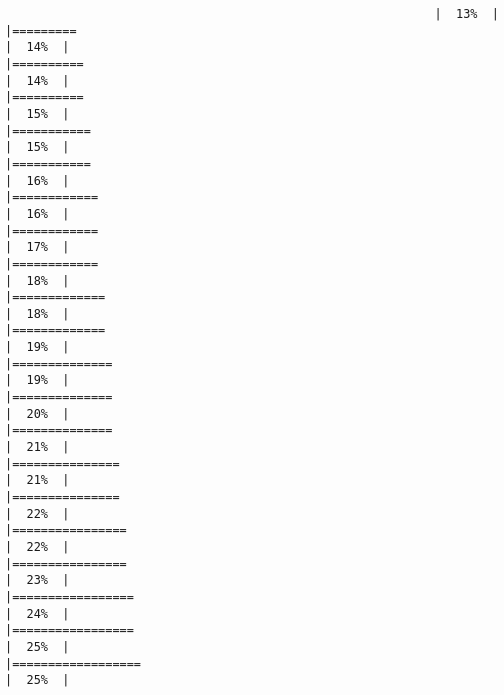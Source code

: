 \documentclass[
]{article}
\begin{document}
\begin{verbatim}
                                                            |  13%  |                                                                              |=========                                                             |  14%  |                                                                              |==========                                                            |  14%  |                                                                              |==========                                                            |  15%  |                                                                              |===========                                                           |  15%  |                                                                              |===========                                                           |  16%  |                                                                              |============                                                          |  16%  |                                                                              |============                                                          |  17%  |                                                                              |============                                                          |  18%  |                                                                              |=============                                                         |  18%  |                                                                              |=============                                                         |  19%  |                                                                              |==============                                                        |  19%  |                                                                              |==============                                                        |  20%  |                                                                              |==============                                                        |  21%  |                                                                              |===============                                                       |  21%  |                                                                              |===============                                                       |  22%  |                                                                              |================                                                      |  22%  |                                                                              |================                                                      |  23%  |                                                                              |=================                                                     |  24%  |                                                                              |=================                                                     |  25%  |                                                                              |==================                                                    |  25%  |                                                                              
\end{verbatim}
\end{document}
